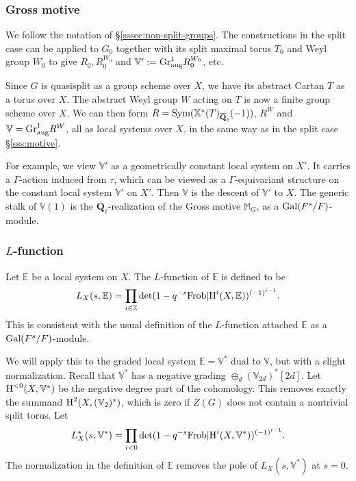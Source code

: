 \documentclass[reqno]{amsart}
\numberwithin{equation}{subsection}
\theoremstyle{definition}
\def\EE{\mathbb{E}}
\def\MM{\mathbb{M}}
\def\VV{\mathbb{V}}
\def\ZZ{\mathbb{Z}}
\newcommand\Frob{\textup{Frob}}
\newcommand\Gal{\textup{Gal}}
\newcommand{\Gr}{\textup{Gr}}
\newcommand\Sym{\textup{Sym}}
\newcommand\xch{\mathbb{X}^*}
\newcommand{\Qlbar}{\overline{\Q}_\ell}
\newcommand\op{\oplus}
\newcommand{\cohog}[2]{\textup{H}^{#1}({#2})}     %
\newcommand\G\Gamma
\renewcommand{\t}{\tau}
\newcommand\aug{\textup{aug}}
\newcommand{\Q}{\mathbf{Q}}
\begin{document}
\subsubsection{Gross motive}
\label{ss: G Motive general}
We follow the notation of \S \ref{sssec:non-split-groups}. The constructions in the split case can be applied to $G_{0}$ together with its split maximal torus $T_{0}$ and Weyl group $W_{0}$ to give $R_{0}, R_{0}^{W_{0}}$ and $\VV' :=\Gr^{1}_{\aug}R_{0}^{W_{0}}$, etc.

Since $G$ is quasisplit as a group scheme over $X$, we have its abstract Cartan $T$ as a torus over $X$. The abstract Weyl group $W$ acting on $T$ is now a finite group scheme over $X$. We can then form $R=\Sym(\xch(T)_{\Qlbar}(-1))$, $R^{W}$ and $\VV=\Gr^{1}_{\aug}R^{W}$, all as local systems over $X$, in the same way as in the split case \S\ref{sss:motive}.  

For example, we view $\VV'$ as a geometrically constant local system on $X'$. It carries a $\G$-action induced from $\t$, which can be viewed as a $\G$-equivariant structure on the constant local system $\VV'$ on $X'$. Then $\VV$ is the descent of $\VV'$ to $X$. The generic stalk of $\VV(1)$ is the $\Qlbar$-realization of the Gross motive $\MM_{G}$, as a $\Gal(F^{s}/F)$-module. 



\subsubsection{$L$-function}
Let $\EE$ be a local system on $X$. The $L$-function of $\EE$ is defined to be
\begin{equation*}
L_{X}(s,\EE)=\prod_{i\in \ZZ}\det(1-q^{-s}\Frob|\cohog{i}{X,\EE})^{(-1)^{i-1}}.
\end{equation*}
This is consistent with the usual definition of the $L$-function attached $\EE$ as a $\Gal(F^{s}/F)$-module.



We will apply this to the graded local system $\EE=\VV^{*}$ dual to $\VV$, but with a slight normalization. Recall that $\VV^{*}$ has a negative grading $\op_{d}(\VV_{2d})^{*}[2d]$. Let $\cohog{<0}{X,\VV^{*}}$ be the negative degree part of the cohomology. This removes exactly the summand $\cohog{2}{X, (\VV_{2})^{*}}$, which is zero if $Z(G)$ does not contain a nontrivial split torus. Let
\begin{equation*}
L^{*}_{X}(s,\VV^{*})=\prod_{i<0}\det(1-q^{-s}\Frob|\cohog{i}{X,\VV^{*}})^{(-1)^{i-1}}.
\end{equation*}
The normalization in the definition of $\EE$ removes the pole of $L_{X}(s,\VV^{*})$ at $s=0$.
\end{document}
